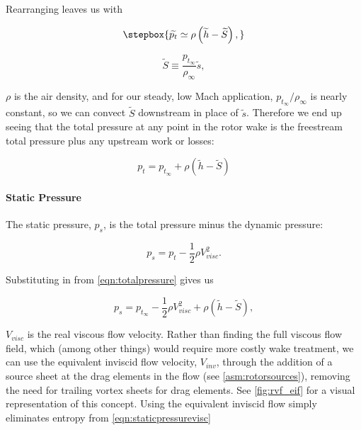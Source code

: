 \noindent Rearranging leaves us with

\begin{equation}
   \label{eqn:totalpressure1}
   \stepbox{
    \widetilde{p_t} \simeq \rho \left(\widetilde{h}-\widetilde{S} \right),
}
\end{equation}

\where

\begin{equation}
    \widetilde{S} \equiv \frac{p_{t_\infty}}{\rho_\infty} \widetilde{s},
\end{equation}


\where \(\rho\) is the air density, and for our steady, low Mach application, \(p_{t_\infty}/\rho_\infty\) is nearly constant, so we can convect \(\widetilde{S}\) downstream in place of \(\widetilde{s}\).
%
Therefore we end up seeing that the total pressure at any point in the rotor wake is the freestream total pressure plus any upstream work or losses:

\begin{equation}
    \label{eqn:totalpressure}
    p_t = p_{t_\infty} + \rho \left(\widetilde{h}-\widetilde{S} \right)
\end{equation}


\paragraph{Static Pressure}
\label{sssec:staticpressure}

The static pressure, \(p_s\), is the total pressure minus the dynamic pressure:

\begin{equation}
    \label{eqn:bernoulli}
    p_s = p_{t} - \frac{1}{2}\rho V_{visc}^2.
\end{equation}

\noindent Substituting in from \cref{eqn:totalpressure} gives us

\begin{equation}
    \label{eqn:staticpressurevisc}
    p_s = p_{t_\infty} - \frac{1}{2}\rho V_{visc}^2 + \rho\left(\widetilde{h}-\widetilde{S} \right),
\end{equation}

\where \(V_{visc}\) is the real viscous flow velocity.
%
Rather than finding the full viscous flow field, which (among other things) would require more costly wake treatment,
we can use the equivalent inviscid flow velocity, \(V_{inv}\),
through the addition of a source sheet at the drag elements in the flow (see \cref{asm:rotorsources}),
removing the need for trailing vortex sheets for drag elements.
%
See \cref{fig:rvf_eif} for a visual representation of this concept.
%
Using the equivalent inviscid flow simply eliminates entropy from \cref{eqn:staticpressurevisc}

